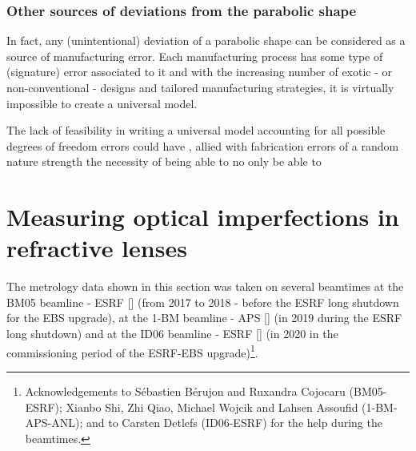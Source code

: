 \begin{refsection}
\subsubsection*{Other sources of deviations from the parabolic shape}


In fact, any (unintentional) deviation of a parabolic shape can be considered as a source of manufacturing error. Each manufacturing process has some type of (signature) error associated to it and with the increasing number of exotic - or non-conventional - designs and tailored manufacturing strategies, it is virtually impossible to create a universal model.

The lack of feasibility in writing a universal model accounting for all possible degrees of freedom errors could have , allied with fabrication errors of a random nature strength the necessity of being able to no only be able to 

\section{Measuring optical imperfections in refractive lenses}

The metrology data shown in this section was taken on several beamtimes at the BM05 beamline - ESRF [\cite{Ziegler2004}] (from 2017 to 2018 - before the ESRF long shutdown for the EBS upgrade), at the 1-BM beamline - APS [\cite{Macrander2016}] (in 2019 during the ESRF long shutdown) and at the ID06 beamline - ESRF [\cite{Kutsal_2019}] (in 2020 in the commissioning period of the ESRF-EBS upgrade)\footnote{Acknowledgements to Sébastien Bérujon and Ruxandra Cojocaru (BM05-ESRF); Xianbo Shi, Zhi Qiao, Michael Wojcik and Lahsen Assoufid (1-BM-APS-ANL); and to Carsten Detlefs (ID06-ESRF) for the help during the beamtimes.}.%


\end{refsection}
